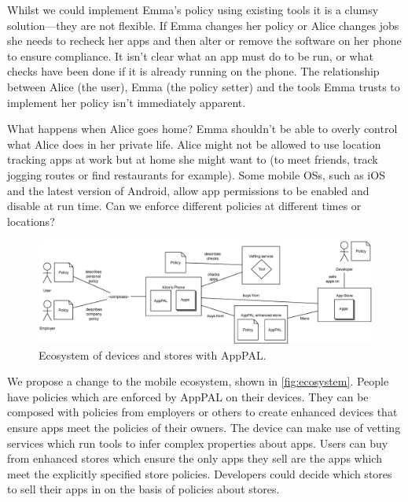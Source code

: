 \documentclass[]{llncs}
\begin{document}
Whilst we could implement Emma's policy using existing tools it is a clumsy solution---they are not flexible.
If Emma changes her policy or Alice changes jobs she needs to recheck her apps and then alter or remove the software on her phone to ensure compliance.
It isn't clear what an app must do to be run, or what checks have been done if it is already running on the phone.
The relationship between Alice (the user), Emma (the policy setter) and the tools Emma trusts to implement her policy isn't immediately apparent.

What happens when Alice goes home?
Emma shouldn't be able to overly control what Alice does in her private life.
Alice might not be allowed to use location tracking apps at work but at home she might want to (to meet friends, track jogging routes or find restaurants for example).
Some mobile OSs, such as iOS and the latest version of Android, allow app permissions to be enabled and disable at run time.
Can we enforce different policies at different times or locations?


\begin{figure}
\includegraphics{figures/overview.eps}
\caption{Ecosystem of devices and stores with AppPAL.}
\label{fig:ecosystem}
\end{figure}

We propose a change to the mobile ecosystem, shown in \autoref{fig:ecosystem}.
People have policies which are enforced by AppPAL on their devices.
They can be composed with policies from employers or others to create enhanced devices that ensure apps meet the policies of their owners.
The device can make use of vetting services which run tools to infer complex properties about apps.
Users can buy from enhanced stores which ensure the only apps they sell are the apps which meet the explicitly specified store policies.
Developers could decide which stores to sell their apps in on the basis of policies about stores.
\end{document}
